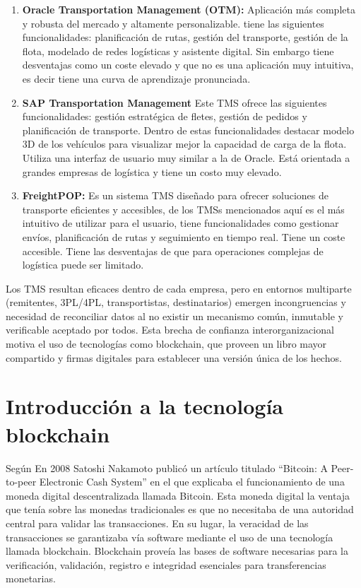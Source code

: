 \begin{enumerate}
    \item \textbf{Oracle Transportation Management (OTM):} Aplicación más completa y robusta del mercado y altamente personalizable. tiene las siguientes funcionalidades: planificación de rutas, gestión del transporte, gestión de la flota, modelado de redes logísticas y asistente digital. Sin embargo tiene desventajas como un coste elevado y que no es una aplicación muy intuitiva, es decir tiene una curva de aprendizaje pronunciada.
    \item \textbf{SAP Transportation Management} Este TMS ofrece las siguientes funcionalidades: gestión estratégica de fletes, gestión de pedidos y planificación de transporte. Dentro de estas funcionalidades destacar modelo 3D de los vehículos para visualizar mejor la capacidad de carga de la flota. Utiliza una interfaz de usuario muy similar a la de Oracle. Está orientada a grandes empresas de logística y tiene un costo muy elevado.
    \item \textbf{FreightPOP:} Es un sistema TMS diseñado para ofrecer soluciones de transporte eficientes y accesibles, de los TMSs mencionados aquí es el más intuitivo de utilizar para el usuario, tiene funcionalidades como gestionar envíos, planificación de rutas y seguimiento en tiempo real. Tiene un coste accesible.
Tiene las desventajas de que para operaciones complejas de logística puede ser limitado.
\end{enumerate}

Los TMS resultan eficaces dentro de cada empresa, pero en entornos multiparte (remitentes, 3PL/4PL, transportistas, destinatarios) emergen incongruencias y necesidad de reconciliar datos al no existir un mecanismo común, inmutable y verificable aceptado por todos. Esta brecha de confianza interorganizacional motiva el uso de tecnologías como blockchain, que proveen un libro mayor compartido y firmas digitales para establecer una versión única de los hechos.

\section{Introducción a la tecnología blockchain}
Según \textcite{blockchainInAction}
En 2008 Satoshi Nakamoto publicó un artículo titulado ``Bitcoin: A Peer-to-peer Electronic Cash System'' en el que explicaba el funcionamiento de una moneda digital descentralizada llamada Bitcoin.
Esta moneda digital la ventaja que tenía sobre las monedas tradicionales es que no necesitaba de una autoridad central para validar las transacciones. En su lugar, la veracidad de las transacciones
se garantizaba vía software mediante el uso de una tecnología llamada blockchain. Blockchain proveía las bases de software necesarias para la verificación, validación, registro e integridad esenciales para transferencias monetarias.\\

